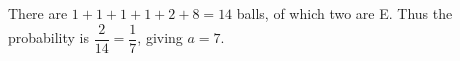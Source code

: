 There are $1+1+1+1+2+8=14$ balls, of which two are E. Thus the probability is $\dfrac{2}{14}=\dfrac{1}{7}$, giving $\boxed{a=7}$.
